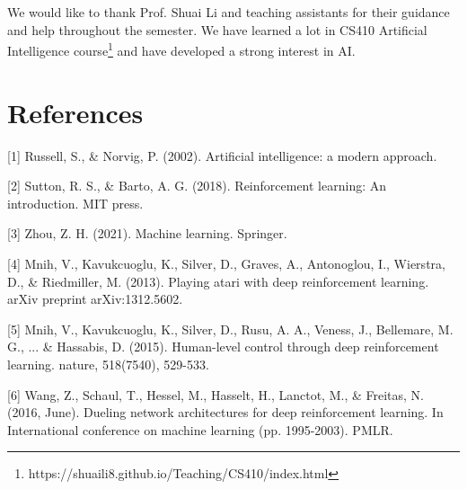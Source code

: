 \documentclass{article}
\begin{document}





\begin{ack}
We would like to thank Prof. Shuai Li and teaching assistants for their guidance and help throughout the semester. We have learned a lot in CS410 Artificial Intelligence course\footnote{https://shuaili8.github.io/Teaching/CS410/index.html} and have developed a strong interest in AI.
\end{ack}

\section*{References}

{
\small

[1] Russell, S., \& Norvig, P. (2002). Artificial intelligence: a modern approach.

[2] Sutton, R. S., \& Barto, A. G. (2018). Reinforcement learning: An introduction. MIT press.

[3] Zhou, Z. H. (2021). Machine learning. Springer.

[4] Mnih, V., Kavukcuoglu, K., Silver, D., Graves, A., Antonoglou, I., Wierstra, D., \& Riedmiller, M. (2013). Playing atari with deep reinforcement learning. arXiv preprint arXiv:1312.5602.

[5] Mnih, V., Kavukcuoglu, K., Silver, D., Rusu, A. A., Veness, J., Bellemare, M. G., ... \& Hassabis, D. (2015). Human-level control through deep reinforcement learning. nature, 518(7540), 529-533.

[6] Wang, Z., Schaul, T., Hessel, M., Hasselt, H., Lanctot, M., \& Freitas, N. (2016, June). Dueling network architectures for deep reinforcement learning. In International conference on machine learning (pp. 1995-2003). PMLR.
}
\end{document}
